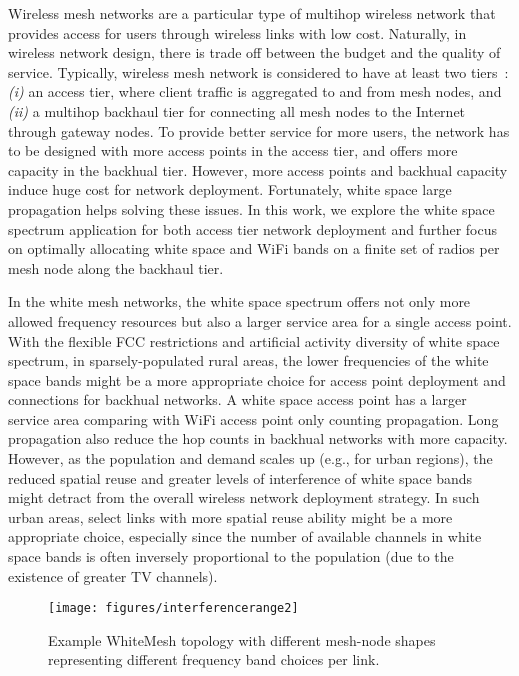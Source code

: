 Wireless mesh networks are a particular type of multihop wireless network that provides access 
for users through wireless links with low cost. Naturally, in wireless network design, there is 
trade off between the budget and the quality of service. Typically, wireless mesh network is 
considered to have at least two tiers~\cite{CRSK06}: {\it (i)} an access tier, where client 
traffic is aggregated to and from mesh nodes, and {\it (ii)} a multihop backhaul tier for 
connecting all mesh nodes to the Internet through gateway nodes. To provide better service for 
more users, the network has to be designed with more access points in the access tier, and 
offers more capacity in the backhual tier. However, more access points and backhual capacity 
induce huge cost for network deployment. Fortunately, white space large propagation helps solving 
these issues. In this work, we explore the white space spectrum application for both access tier 
network deployment and further focus on optimally allocating white space and WiFi bands on a 
finite set of radios per mesh node along the backhaul tier.  

In the white mesh networks, the white space spectrum offers not only more allowed frequency resources
but also a larger service area for a single access point. With the flexible FCC restrictions and 
artificial activity diversity of white space spectrum, in sparsely-populated rural areas, the 
lower frequencies of the white space bands might be a more appropriate choice for access point 
deployment and connections for backhual networks. A white space access point has a larger service
area comparing with WiFi access point only counting propagation. Long propagation also reduce the 
hop counts in backhual networks with more capacity.  
However, as the population and demand scales up (e.g., for urban regions), the reduced spatial 
reuse and greater levels of interference of white space bands might detract from the overall wireless
network deployment strategy. In such urban areas, select links with more spatial reuse ability might
be a more appropriate choice, especially since the number of available channels in white space bands 
is often inversely proportional to the population (due to the existence of greater TV channels).




\begin{figure}
\vspace{-0.0in}
\centering
\texttt{[image: figures/interferencerange2]}
\vspace{-0.1in}
\caption{Example WhiteMesh topology with different mesh-node shapes 
representing different frequency band choices per link.}
\label{fig:interferencerange}
\vspace{-0.2in}
\end{figure}




